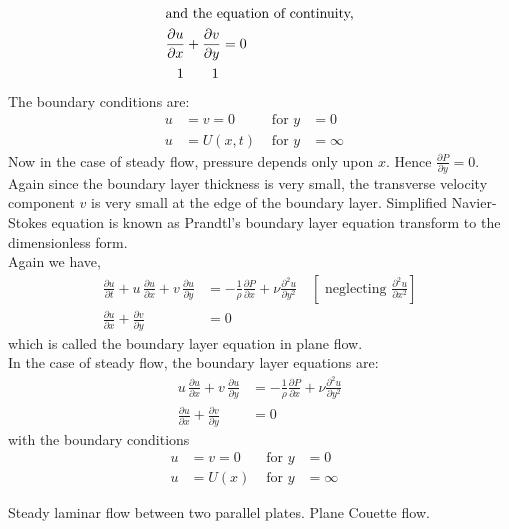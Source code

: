\documentclass[../main-sheet.tex]{subfiles}
\begin{document}
\begin{soln}
\begin{align*}
        \intertext{and the equation of continuity,}
        \frac{\partial u}{\partial x }+\frac{\partial v}{\partial y }&=0\\
        1\quad\quad 1\,&
    \end{align*}
    The boundary conditions are:\\
    \begin{align*}
        u&=v=0 &\text{ for }y&=0&\\
        u&=U(x,t) &\text{ for }y&=\infty&
    \end{align*}
    Now in the case of steady flow, pressure depends only upon \(x \). Hence \(\frac{\partial P }{\partial y }=0\). Again since the boundary layer thickness is very small, the transverse velocity component \(v \) is very small at the edge of the boundary layer. Simplified Navier-Stokes equation is known as Prandtl's boundary layer equation transform to the dimensionless form.\\
    Again we have,
    \begin{align*}
        {\frac{\partial u}{\partial t }}+{u}\,{\frac{\partial u}{\partial x }}+{v}\,\frac{\partial u}{\partial y }&=-\frac{1}{\rho}\frac{\partial P}{\partial x }+
        \nu  \frac{\partial^2 u }{\partial y^2}\quad[\text{ neglecting }\frac{\partial^2 u }{\partial x^2}]\\
        \frac{\partial u}{\partial x }+\frac{\partial v}{\partial y }&=0
    \end{align*}
    which is called the boundary layer equation in plane flow.\\
    In the case of steady flow, the boundary layer equations are:
    \begin{align*}
        {u}\,{\frac{\partial u}{\partial x }}+{v}\,\frac{\partial u}{\partial y }&=-\frac{1}{\rho}\frac{\partial P}{\partial x }+
        \nu  \frac{\partial^2 u }{\partial y^2}\\
        \frac{\partial u}{\partial x }+\frac{\partial v}{\partial y }&=0
    \end{align*}
    with the boundary conditions
    \begin{align*}
        u&=v=0 &\text{ for }y&=0&\\
        u&=U(x) &\text{ for }y&=\infty&
    \end{align*}
\end{soln}
\begin{prob}
    Steady laminar flow between two parallel plates. Plane Couette flow.
\end{prob}
\end{document}
